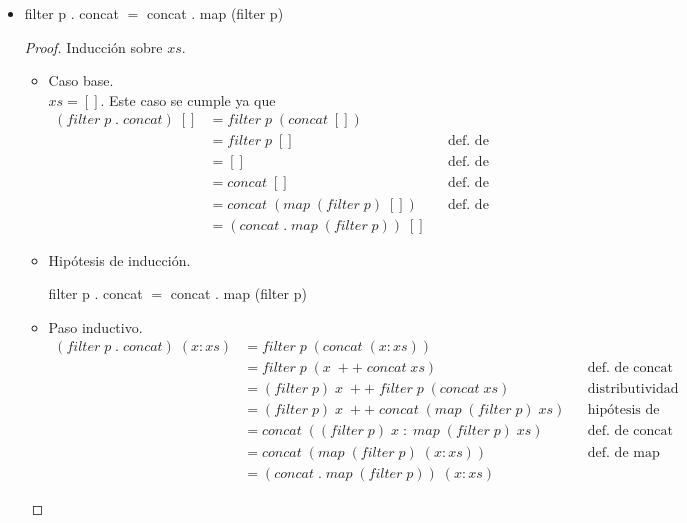 \documentclass[letterpaper,11pt]{article}
\begin{document}
\begin{enumerate}
\begin{itemize}
        \item filter p . concat $=$ concat . map (filter p)
        \begin{proof}
            Inducción sobre $xs$.
            \begin{itemize}
                \item Caso base. \\ 
                $xs = []$. Este caso se cumple ya que 
                \begin{align*}
                    (filter \; p \; . \; concat) \; [] 
                    &= filter \; p \; (concat \; []) \\ 
                    &= filter \; p \; []
                    && \text{def. de concat} \\ 
                    &= []
                    && \text{def. de filter} \\ 
                    &= concat \; []
                    && \text{def. de concat} \\ 
                    &= concat \; (map \; (filter \; p) \; [])
                    && \text{def. de map} \\  
                    &= (concat \; . \; map \; (filter \; p)) \; []
                \end{align*}

                \item Hipótesis de inducción.
                \begin{center}
                    filter p . concat $=$ concat . map (filter p)
                \end{center}

                \item Paso inductivo.
                \begin{align*}
                    (filter \; p \; . \; concat) \; (x:xs)
                    &= filter \; p \; (concat \; (x:xs)) \\ 
                    &= filter \; p \; (x \; ++ \; concat \; xs)
                    && \text{def. de concat} \\
                    &= (filter \; p) \; x \; ++ \; filter \; p \; (concat \; xs) 
                    && \text{distributividad} \\  
                    &= (filter \; p) \; x \; ++ \; concat \; (map \; (filter \; p) \; xs) 
                    && \text{hipótesis de inducción} \\ 
                    &= concat \; ((filter \; p) \; x \; : \; map \; (filter \; p) \; xs)
                    && \text{def. de concat} \\
                    &= concat \; (map \; (filter \; p) \; (x:xs))
                    && \text{def. de map} \\
                    &= (concat \; . \; map \; (filter \; p)) \; (x:xs)
                \end{align*}
            \end{itemize}
        \end{proof}
    \end{itemize}


\end{enumerate}
\end{document}
